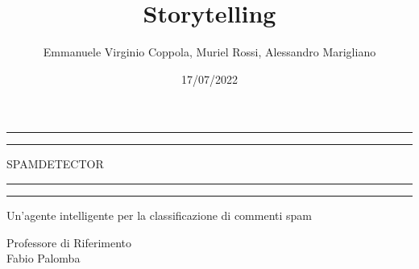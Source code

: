 \documentclass{report}
\title{Storytelling} %
\author{Emmanuele Virginio Coppola, Muriel Rossi, Alessandro Marigliano} %
\date{17/07/2022}
\begin{document}
    \begin{titlepage}

	\centering %
	
	\scshape %
	
	\vspace*{\baselineskip} %
	
	
	\rule{\textwidth}{1.6pt}\vspace*{-\baselineskip}\vspace*{2pt} %
	\rule{\textwidth}{0.4pt} %
	
	\vspace{0.75\baselineskip} %
	
	{\LARGE SPAMDETECTOR} %
	
	\vspace{0.75\baselineskip} %
	
	\rule{\textwidth}{0.4pt}\vspace*{-\baselineskip}\vspace{3.2pt} %
	\rule{\textwidth}{1.6pt} %
	
	\vspace{2\baselineskip} %
	
	
	Un'agente intelligente per la classificazione di commenti spam %
	
	\vspace*{3\baselineskip} %
	
	Professore di Riferimento\\
	
	{\LARGE Fabio Palomba\\}
	
	\vspace{0.5\baselineskip}
	

\end{titlepage}
\end{document}
